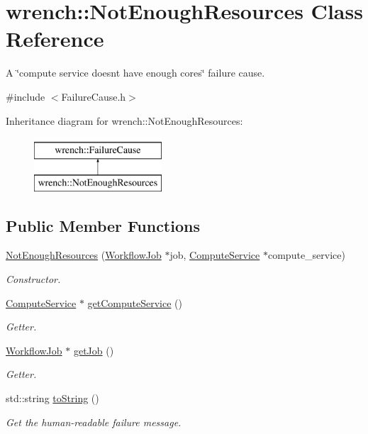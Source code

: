 \hypertarget{classwrench_1_1_not_enough_resources}{}\section{wrench\+:\+:Not\+Enough\+Resources Class Reference}
\label{classwrench_1_1_not_enough_resources}


A \char`\"{}compute service doesn\textquotesingle{}t have enough cores\char`\"{} failure cause.  




{\ttfamily \#include $<$Failure\+Cause.\+h$>$}

Inheritance diagram for wrench\+:\+:Not\+Enough\+Resources\+:\begin{figure}[H]
\begin{center}
\leavevmode
\includegraphics[height=2.000000cm]{classwrench_1_1_not_enough_resources}
\end{center}
\end{figure}
\subsection*{Public Member Functions}
\begin{DoxyCompactItemize}
\item 
\hyperlink{classwrench_1_1_not_enough_resources_a3ed2fb3a0726d4072ffed8c91521fda4}{Not\+Enough\+Resources} (\hyperlink{classwrench_1_1_workflow_job}{Workflow\+Job} $\ast$job, \hyperlink{classwrench_1_1_compute_service}{Compute\+Service} $\ast$compute\+\_\+service)
\begin{DoxyCompactList}\small\item\em Constructor. \end{DoxyCompactList}\item 
\hyperlink{classwrench_1_1_compute_service}{Compute\+Service} $\ast$ \hyperlink{classwrench_1_1_not_enough_resources_a2ded283721b584804b1220b2db4548b3}{get\+Compute\+Service} ()
\begin{DoxyCompactList}\small\item\em Getter. \end{DoxyCompactList}\item 
\hyperlink{classwrench_1_1_workflow_job}{Workflow\+Job} $\ast$ \hyperlink{classwrench_1_1_not_enough_resources_a8bf50edc9be82619b404ae82a9288f94}{get\+Job} ()
\begin{DoxyCompactList}\small\item\em Getter. \end{DoxyCompactList}\item 
std\+::string \hyperlink{classwrench_1_1_not_enough_resources_aeccad36aeccb259ac4c2d17752963269}{to\+String} ()
\begin{DoxyCompactList}\small\item\em Get the human-\/readable failure message. \end{DoxyCompactList}\end{DoxyCompactItemize}
